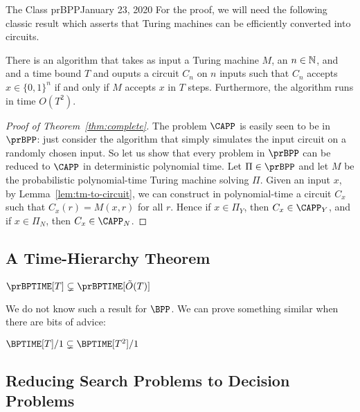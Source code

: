 \begin{lecture}{1}{The Class prBPP}{January 23, 2020}
For the proof, we will need the following classic result which asserts that
Turing machines can be efficiently converted into circuits.
\begin{lemma}\label{lem:tm-to-circuit}
  There is an algorithm that takes as input a Turing machine $M$, an $n \in
  \mathbb{N}$, and and a time bound $T$ and ouputs a circuit $C_n$ on $n$ inputs
  such that $C_n$ accepts $x \in \{0, 1\}^n$ if and only if $M$ accepts
  $x$ in $T$ steps. Furthermore, the algorithm runs in time $O(T^2)$.
\end{lemma}

\begin{proof}[Proof of Theorem~\ref{thm:complete}]
  The problem $\CAPP$ is easily seen to be in $\prBPP$: just consider the
  algorithm that simply simulates the input circuit on a randomly chosen input.
  So let us show that every problem in $\prBPP$ can be reduced to $\CAPP$ in
  deterministic polynomial time. Let $\Pi \in \prBPP$ and let $M$ be the
  probabilistic polynomial-time Turing machine solving $\Pi$. Given an input
  $x$, by Lemma~\ref{lem:tm-to-circuit}, we can construct in polynomial-time a
  circuit $C_x$ such that $C_x(r) = M(x, r)$ for all $r$. Hence if $x \in
  \Pi_Y$, then $C_x \in \CAPP_Y$, and if $x \in \Pi_N$, then $C_x \in \CAPP_N$.
\end{proof}

\subsection{A Time-Hierarchy Theorem}

\begin{theorem}
  $\prBPTIME[T] \subsetneq \prBPTIME[\tilde{O}(T)]$
\end{theorem}


We do not know such a result for $\BPP$. We can prove something similar when there are bits of advice:

\begin{proposition}
	$ \BPTIME[T]/1  \subsetneq \BPTIME[T^2]/1$ 
\end{proposition}



\subsection{Reducing Search Problems to Decision Problems}


\end{lecture}
